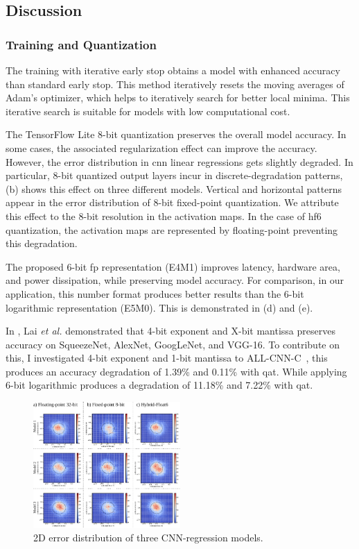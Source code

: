 \subsection{Discussion}
\subsubsection{Training and Quantization}
The training with iterative early stop obtains a model with enhanced accuracy than standard early stop. This method iteratively resets the moving averages of Adam's optimizer, which helps to iteratively search for better local minima. This iterative search is suitable for models with low computational cost.

The TensorFlow Lite 8-bit quantization preserves the overall model accuracy. In some cases, the associated regularization effect can improve the accuracy. However, the error distribution in \gls{cnn} linear regressions gets slightly degraded. In particular, 8-bit quantized output layers incur in discrete-degradation patterns, (b) shows this effect on three different models. Vertical and horizontal patterns appear in the error distribution of 8-bit fixed-point quantization. We attribute this effect to the 8-bit resolution in the activation maps. In the case of \gls{hf6} quantization, the activation maps are represented by floating-point preventing this degradation.

The proposed 6-bit \gls{fp} representation (E4M1) improves latency, hardware area, and power dissipation, while preserving model accuracy. For comparison, in our application, this number format produces better results than the 6-bit logarithmic representation (E5M0). This is demonstrated in (d) and (e).

In \cite{lai2017deep}, Lai \textit{et al.} demonstrated that 4-bit exponent and X-bit mantissa preserves accuracy on SqueezeNet, AlexNet, GoogLeNet, and VGG-16. To contribute on this, I investigated 4-bit exponent and 1-bit mantissa to ALL-CNN-C~\cite{springenberg2014striving}, this produces an accuracy degradation of 1.39\% and 0.11\% with \gls{qat}. While applying 6-bit logarithmic produces a degradation of 11.18\% and 7.22\% with \gls{qat}.

\begin{figure}[t!]
	\centering
	\includegraphics[width=0.5\textwidth]{./chapters/cnn_accelerator/figures/histograms/2D_error_distribtion.pdf}
	\caption{2D error distribution of three CNN-regression models.}
	\label{fig:2d_error_distribtion}
\end{figure}


